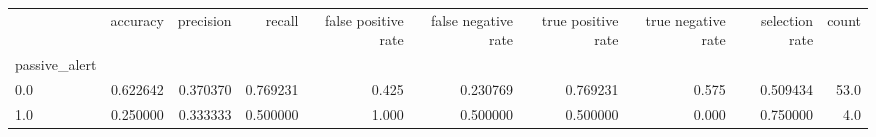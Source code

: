 \begin{tabular}{lrrrrrrrrr}
\toprule
{} &  accuracy &  precision &    recall &  false positive rate &  false negative rate &  true positive rate &  true negative rate &  selection rate &  count \\
passive\_alert &           &            &           &                      &                      &                     &                     &                 &        \\
\midrule
0.0           &  0.622642 &   0.370370 &  0.769231 &                0.425 &             0.230769 &            0.769231 &               0.575 &        0.509434 &   53.0 \\
1.0           &  0.250000 &   0.333333 &  0.500000 &                1.000 &             0.500000 &            0.500000 &               0.000 &        0.750000 &    4.0 \\
\bottomrule
\end{tabular}
